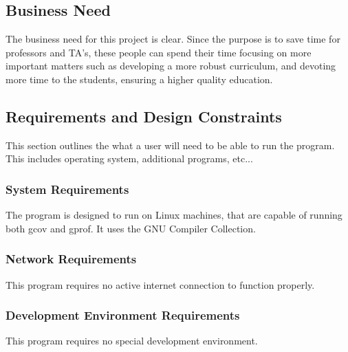 \documentclass {article}
\begin{document}
	 	\subsection{\Large{\color{blue}Business Need}}
	 		The business need for this project is clear. Since the purpose is to
	 		 save time for professors and TA's, these people can spend their time
	 		 focusing on more important matters such as developing a more robust
	 		 curriculum, and devoting more time to the students, ensuring a higher
	 		 quality education.
	 		 
	 	\subsection{\Large{\color{blue}Requirements and Design Constraints}}
	 		This section outlines the what a user will need to be able to run the
	 		 program. This includes operating system, additional programs, etc...
	 		 
	 		 \subsubsection{\large{\color{cyan}System Requirements}}
	 		 	The program is designed to run on Linux machines, that are capable
	 		 	 of running both gcov and gprof. It uses the GNU Compiler
	 		 	 Collection.
	 		 	 
	 		 \subsubsection{\large{\color{cyan}Network Requirements}}
	 		 	This program requires no active internet connection to function
	 		 	 properly.
	 		 	 
	 		 \subsubsection{\large{\color{cyan}Development Environment Requirements}}
	 		 	This program requires no special development environment.
	 		 	
\end{document}

